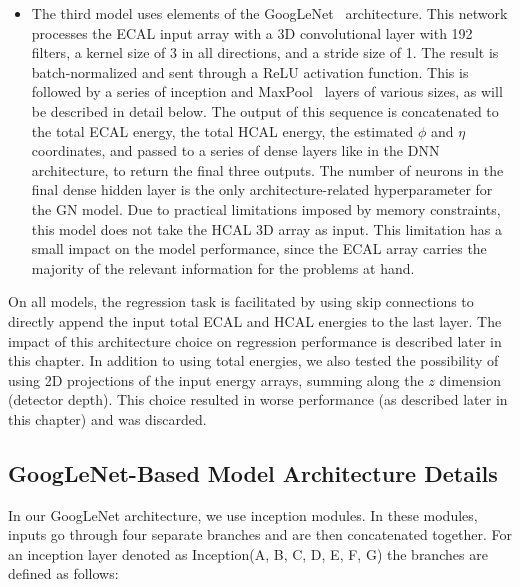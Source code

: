 \begin{itemize}
    \item The third model uses elements of the GoogLeNet~\cite{GoogLeNet} architecture. This network processes the ECAL input array with a 3D convolutional layer with 192 filters, a kernel size of 3 in all directions, and a stride size of 1. The result is batch-normalized and sent through a ReLU activation function. This is followed by a series of inception and MaxPool~\cite{conv} layers of various sizes, as will be described in detail below. The output of this sequence is concatenated to the total ECAL energy, the total HCAL energy, the estimated $\phi$ and $\eta$ coordinates, and passed to a series of dense layers like in the DNN architecture, to return the final three outputs. The number of neurons in the final dense hidden layer is the only architecture-related hyperparameter for the GN model. Due to practical limitations imposed by memory constraints, this model does not take the HCAL 3D array as input. This limitation has a small impact on the model performance, since the ECAL array carries the majority of the relevant information for the problems at hand.
\end{itemize}

On all models, the regression task is facilitated by using skip connections to directly append the input total ECAL and HCAL energies to the last layer. The impact of this architecture choice on regression performance is described later in this chapter. In addition to using total energies, we also tested the possibility of using 2D projections of the input energy arrays, summing along the $z$ dimension (detector depth). This choice resulted in worse performance (as described later in this chapter) and was discarded.

\subsection*{GoogLeNet-Based Model Architecture Details}

In our GoogLeNet architecture, we use inception modules. In these modules, inputs go through four separate branches and are then concatenated together. For an inception layer denoted as Inception(A, B, C, D, E, F, G) the branches are defined as follows:

